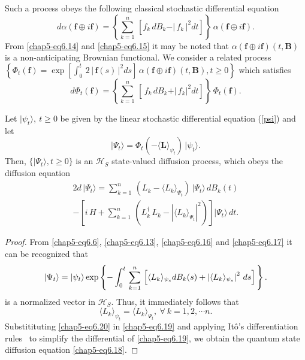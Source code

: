 Such a process obeys the following classical stochastic differential equation   
\begin{equation}
d\alpha(\mathbf{f}\oplus i\mathbf{f})=  \left\{\sum_{k=1}^{n}\,\left[ f_k\, dB_k-\vert\, f_k\,\vert^2 dt\right]\right\}\, \alpha(\mathbf{f}\oplus i\mathbf{f}).\label{chap5-eq6.15}
\end{equation}
From \eqref{chap5-eq6.14} and \eqref{chap5-eq6.15} it may be noted that $\alpha(\mathbf{f}\oplus i\mathbf{f})(t,\mathbf{B})$ is a  non-anticipating Brownian functional. We consider a related process $\left\{\Phi_t(\mathbf{f}) = {\exp}\left[\int_0^t\, 2\,\vert\,\mathbf{f}(s)\,\vert^2 ds\right]\, \alpha(\mathbf{f}\oplus i \mathbf{f})(t,\mathbf{B}), t\geq 0\right\}$ which satisfies 
\begin{equation}
d\Phi_t(\mathbf{f})= \left\{\sum_{k=1}^n\, \left[\, f_k\, dB_k+\vert\,f_k\vert^2 dt\right]\right\}\, \Phi_t(\mathbf{f}). \label{chap5-eq6.16}
\end{equation}

\begin{thm}\label{chap5-thm2}
Let $\vert\psi_t\rangle,\ t\geq 0$ be given by the linear stochastic differential equation (\ref{psi}) and let  
\begin{equation}
\vert \Psi_t\rangle=\Phi_t(-\langle\mathbf{L}\rangle_{\psi_t})\, \vert\psi_t\rangle. \label{chap5-eq6.17}
\end{equation}
Then, $\{\vert \Psi_t\rangle, t\geq 0\}$ is an $\mathcal{H}_S$ state-valued diffusion process, which obeys the diffusion equation  
\begin{multline}{2}
d\,\vert\Psi_t\rangle = \sum_{k=1}^n\, (L_k-\langle L_k\rangle_{\Psi_t})\, \vert\Psi_t\rangle\, dB_k(t) \\
- \left[i\, H + \sum_{k=1}^n\, \left(L_k^\dag\, L_k-\left|\langle L_k\rangle_{\Psi_t} \right|^2 \right) \right] \vert\Psi_t\rangle\, dt. \label{chap5-eq6.18}
\end{multline}
\end{thm}

\begin{proof}
From \eqref{chap5-eq6.6}, \eqref{chap5-eq6.13}, \eqref{chap5-eq6.16} and \eqref{chap5-eq6.17} it can be recognized that   
\begin{equation}
\vert\Psi_t\rangle=\vert \psi_t\rangle\, {\rm exp}\left\{-\int_{0}^t\, \sum_{k=1}^n\, 
\left[\langle  L_k\rangle_{\psi_s} d B_k(s)+ \left|\langle  L_k\rangle_{\psi_s}\right|^2\, ds\right]\, \right\}. \label{chap5-eq6.19}
\end{equation} 
is a normalized vector in $\mathcal{H}_S$. Thus, it immediately follows that      
\begin{equation}
\langle L_k\rangle_{\psi_t}=\langle L_k\rangle_{\Psi_t},\ \forall\ k=1,2,\cdots n.\label{chap5-eq6.20}
\end{equation}
Substitituting \eqref{chap5-eq6.20} in \eqref{chap5-eq6.19}
and applying It{\^o}'s differentiation rules~\cite{key38} to simplify the differential of \eqref{chap5-eq6.19}, we obtain the quantum state diffusion equation \eqref{chap5-eq6.18}. 
\end{proof}

